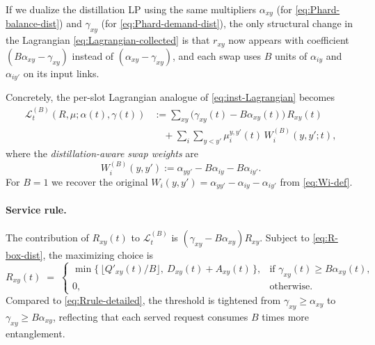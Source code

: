 \documentclass[11pt]{article}
\begin{document}
If we dualize the distillation LP using the same multipliers
$\alpha_{xy}$ (for \eqref{eq:Phard-balance-dist}) and $\gamma_{xy}$
(for \eqref{eq:Phard-demand-dist}), the only structural change in the
Lagrangian \eqref{eq:Lagrangian-collected} is that $r_{xy}$ now appears
with coefficient $(B\alpha_{xy}-\gamma_{xy})$ instead of
$(\alpha_{xy}-\gamma_{xy})$, and each swap uses $B$ units of
$\alpha_{iy}$ and $\alpha_{iy'}$ on its input links.

Concretely, the per-slot Lagrangian analogue of
\eqref{eq:inst-Lagrangian} becomes
\begin{equation}
\begin{aligned}
\mathcal{L}^{(B)}_t(R,\mu;\alpha(t),\gamma(t))
&:= \sum_{xy}
\big(\gamma_{xy}(t)-B\alpha_{xy}(t)\big)\,R_{xy}(t) \\
&\quad + \sum_i \sum_{y<y'}
\mu_i^{y,y'}(t)\,W_i^{(B)}(y,y';t),
\end{aligned}
\label{eq:inst-Lagrangian-B}
\end{equation}
where the \emph{distillation-aware swap weights} are
\begin{equation}
W_i^{(B)}(y,y')
:= \alpha_{yy'}-B\alpha_{iy}-B\alpha_{iy'}.
\label{eq:WiB-def}
\end{equation}
For $B=1$ we recover the original
$W_i(y,y')=\alpha_{yy'}-\alpha_{iy}-\alpha_{iy'}$ from
\eqref{eq:Wi-def}.

\paragraph{Service rule.}
The contribution of $R_{xy}(t)$ to $\mathcal{L}^{(B)}_t$ is
$(\gamma_{xy}-B\alpha_{xy})R_{xy}$. Subject to
\eqref{eq:R-box-dist}, the maximizing choice is
\begin{equation}
R_{xy}(t)\;=\;
\begin{cases}
\min\!\big\{\,\lfloor Q'_{xy}(t)/B\rfloor,\ D_{xy}(t)+A_{xy}(t)\,\big\},
&\text{if }\gamma_{xy}(t)\ge B\alpha_{xy}(t),\\[4pt]
0, &\text{otherwise.}
\end{cases}
\label{eq:Rrule-B}
\end{equation}
Compared to \eqref{eq:Rrule-detailed}, the threshold is tightened
from $\gamma_{xy}\ge\alpha_{xy}$ to $\gamma_{xy}\ge B\alpha_{xy}$,
reflecting that each served request consumes $B$ times more
entanglement.
\end{document}
